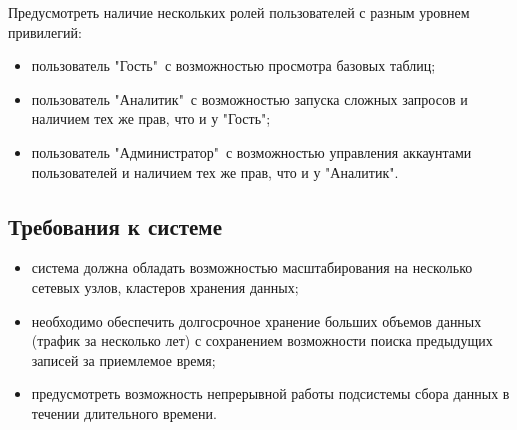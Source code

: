Предусмотреть наличие нескольких ролей пользователей с разным уровнем привилегий:
\begin{itemize}
	\item пользователь "Гость"\ с возможностью просмотра базовых таблиц;
	\item пользователь "Аналитик"\  с возможностью запуска сложных запросов и наличием тех же прав, что и у "Гость";
	\item пользователь "Администратор"\  с возможностью управления аккаунтами пользователей и наличием тех же прав, что и у "Аналитик".
\end{itemize}

\subsection{Требования к системе}
\begin{itemize}
	\item система должна обладать возможностью масштабирования на несколько сетевых узлов, кластеров хранения данных;
	\item необходимо обеспечить долгосрочное хранение больших объемов данных (трафик за несколько лет) с сохранением возможности поиска предыдущих записей
		за приемлемое время;
	\item предусмотреть возможность непрерывной работы подсистемы сбора данных в течении длительного времени.
\end{itemize}

